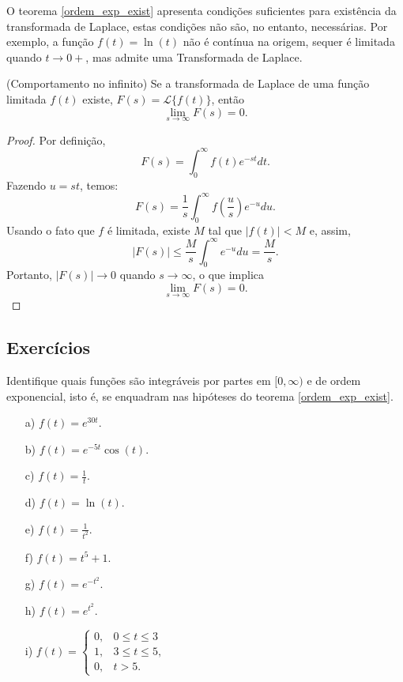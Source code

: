 \begin{obs} O teorema \ref{ordem_exp_exist} apresenta condições suficientes para existência da transformada de Laplace, estas condições não são, no entanto, necessárias. Por exemplo, a função $f(t)=\ln(t)$ não é contínua na origem, sequer é limitada quando $t\to 0+$, mas admite uma Transformada de Laplace.
 \end{obs}
\begin{teo} (Comportamento no infinito) Se a transformada de Laplace de uma função limitada $f(t)$ existe, $F(s)=\mathcal{L}\{f(t)\}$, então
\begin{equation}
\lim_{s\to\infty}F(s)=0.
\end{equation}
\end{teo}
\begin{proof}
 Por definição,
 \begin{equation}
 F(s)=\int_0^\infty f(t)e^{-st}dt.
 \end{equation}
Fazendo $u=st$, temos:
\begin{equation}
 F(s)=\frac{1}{s}\int_0^\infty f\left(\frac{u}{s}\right)e^{-u}du.
 \end{equation}
 Usando o fato que $f$ é limitada, existe $M$ tal que $|f(t)|<M$ e, assim,
\begin{equation}
| F(s) |\leq \frac{M}{s}\int_0^\infty e^{-u}du = \frac{M}{s}.
 \end{equation}
 Portanto, $|F(s)|\to 0$ quando $s\to \infty$, o que implica 
 \begin{equation}
\lim_{s\to\infty}F(s)=0.
\end{equation}
\end{proof}

\subsection*{Exercícios}
\begin{exer}Identifique quais funções são integráveis por partes em $[0,\infty)$ e de ordem exponencial, isto é, se enquadram nas hipóteses do teorema \ref{ordem_exp_exist}.
\begin{itemize}
 \item[a)] $f(t)=e^{30t}$.
 \item[b)] $f(t)=e^{-5t}\cos(t) $.
 \item[c)] $f(t)=\frac{1}{t}$.
 \item[d)] $f(t)=\ln(t)$.
 \item[e)] $f(t)=\frac{1}{t^2}$.
  \item[f)] $f(t)=t^{5}+1$.
  \item[g)] $f(t)=e^{-t^2}$.
  \item[h)] $f(t)=e^{t^2}$.

  
  \item[i)] $
f(t)=\left\{\begin{array}{ll} 0, &0\leq t\leq 3\\ 1, & 3\leq t\leq 5,\\0,&t>5.
\end{array}\right.
$
\end{itemize}


\end{exer}


